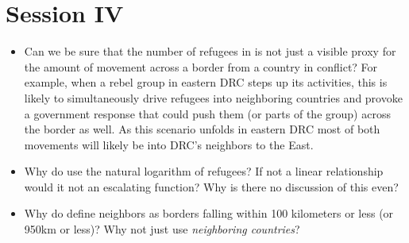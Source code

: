 \documentclass[12pt]{article}
\begin{document}
\section*{Session IV}

\begin{itemize}

	\item Can we be sure that the number of refugees in \citet{Salehyan2006}
		is not just a visible proxy for the amount of movement across a
		border from a country in conflict? For example, when a rebel
		group in eastern DRC steps up its activities, this is likely to
		simultaneously drive refugees into neighboring countries and
		provoke a government response that could push them (or parts of
		the group) across the border as well. As this scenario unfolds
		in eastern DRC most of both movements will likely be into DRC's
		neighbors to the East.

	\item  Why do \citet{Salehyan2006} use the natural logarithm of
		refugees? If not a linear relationship would it not an
		escalating function? Why is there no discussion of this even?
	
	\item Why do \citet{Salehyan2006} define neighbors as borders falling
		within 100 kilometers or less (or 950km or less)? Why not just
		use \textit{neighboring countries}?

\end{itemize}

\pagebreak



\end{document}
